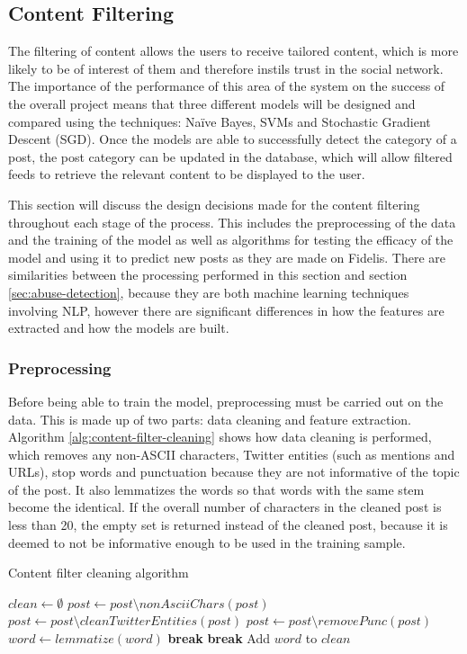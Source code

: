 \subsection{Content Filtering}
The filtering of content allows the users to receive tailored content, which is more likely to be of interest of them and therefore instils trust in the social network. The importance of the performance of this area of the system on the success of the overall project means that three different models will be designed and compared using the techniques: Na\"ive Bayes, SVMs and Stochastic Gradient Descent (SGD). Once the models are able to successfully detect the category of a post, the post category can be updated in the database, which will allow filtered feeds to retrieve the relevant content to be displayed to the user. 

This section will discuss the design decisions made for the content filtering throughout each stage of the process. This includes the preprocessing of the data and the training of the model as well as algorithms for testing the efficacy of the model and using it to predict new posts as they are made on Fidelis. There are similarities between the processing performed in this section and section \ref{sec:abuse-detection}, because they are both machine learning techniques involving NLP, however there are significant differences in how the features are extracted and how the models are built.

\subsubsection{Preprocessing}
Before being able to train the model, preprocessing must be carried out on the data. This is made up of two parts: data cleaning and feature extraction. Algorithm \ref{alg:content-filter-cleaning} shows how data cleaning is performed, which removes any non-ASCII characters, Twitter entities (such as mentions and URLs), stop words and punctuation because they are not informative of the topic of the post. It also lemmatizes the words so that words with the same stem become the identical. If the overall number of characters in the cleaned post is less than 20, the empty set is returned instead of the cleaned post, because it is deemed to not be informative enough to be used in the training sample.

\begin{algorithm}
\caption{Content filter cleaning algorithm}
\label{alg:content-filter-cleaning}
\begin{algorithmic}[1]
	\State $clean\gets \emptyset$
	\State $post\gets post\setminus nonAsciiChars(post)$ 
	\State $post\gets post\setminus cleanTwitterEntities(post)$
	\State $post\gets post\setminus removePunc(post)$
		\State $word\gets lemmatize(word)$
			\State \textbf{break} 
		\EndIf
			\State \textbf{break} 
		\EndIf
		\State Add $word$ to $clean$
	\EndFor
		\State \Return{$\emptyset$}
	\Else
		\State {}
	\EndIf
\EndFunction
\end{algorithmic}
\end{algorithm}

